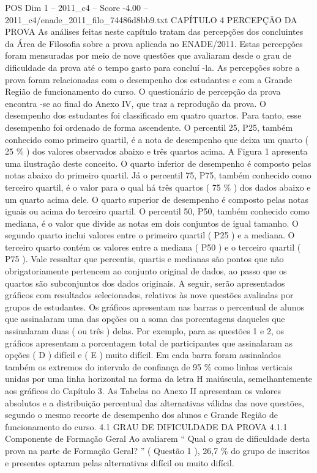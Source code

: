 \begin{textsample}{POS Dim 1 – 2011\_c4 – Score -4.00 – 2011\_c4/enade\_2011\_filo\_74486d8bb9.txt}  \label{ex:f1_pos_330}
CAPÍTULO 4 PERCEPÇÃO DA PROVA As análises feitas neste capítulo tratam das percepções dos concluintes da Área de Filosofia sobre a prova aplicada no ENADE/2011.
Estas percepções foram mensuradas por meio de nove questões que avaliaram desde o grau de dificuldade da prova até o tempo gasto para concluí -la.
As percepções sobre a prova foram relacionadas com o desempenho dos estudantes e com a Grande Região de funcionamento do curso.
O questionário de percepção da prova encontra -se ao final do Anexo IV, que traz a reprodução da prova.
O desempenho dos estudantes foi classificado em quatro quartos.
Para tanto, esse desempenho foi ordenado de forma ascendente.
O percentil 25, P25, também conhecido como primeiro quartil, é a nota de desempenho que deixa um quarto ( 25 \% ) dos valores observados abaixo e três quartos acima.
A Figura 1 apresenta uma ilustração deste conceito.
O quarto inferior de desempenho é composto pelas notas abaixo do primeiro quartil.
Já o percentil 75, P75, também conhecido como terceiro quartil, é o valor para o qual há três quartos ( 75 \% ) dos dados abaixo e um quarto acima dele.
O quarto superior de desempenho é composto pelas notas iguais ou acima do terceiro quartil.
O percentil 50, P50, também conhecido como mediana, é o valor que divide as notas em dois conjuntos de igual tamanho.
O segundo quarto inclui valores entre o primeiro quartil ( P25 ) e a mediana.
O terceiro quarto contém os valores entre a mediana ( P50 ) e o terceiro quartil ( P75 ).
Vale ressaltar que percentis, quartis e medianas são pontos que não obrigatoriamente pertencem ao conjunto original de dados, ao passo que os quartos são subconjuntos dos dados originais.
A seguir, serão apresentados gráficos com resultados selecionados, relativos às nove questões avaliadas por grupos de estudantes.
Os gráficos apresentam nas barras o percentual de alunos que assinalaram uma das opções ou a soma das porcentagens daqueles que assinalaram duas ( ou três ) delas.
Por exemplo, para as questões 1 e 2, os gráficos apresentam a porcentagem total de participantes que assinalaram as opções ( D ) difícil e ( E ) muito difícil.
Em cada barra foram assinalados também os extremos do intervalo de confiança de 95 \% como linhas verticais unidas por uma linha horizontal na forma da letra H maiúscula, semelhantemente aos gráficos do Capítulo 3.
As Tabelas no Anexo II apresentam os valores absolutos e a distribuição percentual das alternativas válidas das nove questões, segundo o mesmo recorte de desempenho dos alunos e Grande Região de funcionamento do curso. 4.1 GRAU DE DIFICULDADE DA PROVA 4.1.1 Componente de Formação Geral Ao avaliarem “ Qual o grau de dificuldade desta prova na parte de Formação Geral? ” ( Questão 1 ), 26,7 \% do grupo de inscritos e presentes optaram pelas alternativas difícil ou muito difícil.

\end{textsample}
